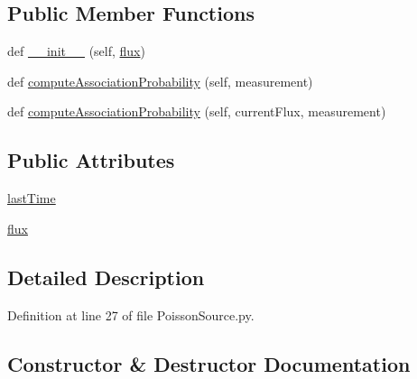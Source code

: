 \subsection*{Public Member Functions}
\begin{DoxyCompactItemize}
\item 
def \hyperlink{classmodest_1_1signals_1_1PoissonSource_1_1__StaticPoissonSource_acf94f57b30499c3a5d2a8ecb252ffcf7}{\+\_\+\+\_\+init\+\_\+\+\_\+} (self, \hyperlink{classmodest_1_1signals_1_1PoissonSource_1_1__PoissonSource_aab3036b1351c531257d2384ea0ff4ae5}{flux})
\item 
def \hyperlink{classmodest_1_1signals_1_1PoissonSource_1_1__StaticPoissonSource_af7b2cc8b56e06566a4c377adb354d377}{compute\+Association\+Probability} (self, measurement)
\item 
def \hyperlink{classmodest_1_1signals_1_1PoissonSource_1_1__PoissonSource_ab8100a2c9f0b5f850ff08f56e7a11cae}{compute\+Association\+Probability} (self, current\+Flux, measurement)
\end{DoxyCompactItemize}
\subsection*{Public Attributes}
\begin{DoxyCompactItemize}
\item 
\hyperlink{classmodest_1_1signals_1_1PoissonSource_1_1__PoissonSource_a96ba5dd0643792be6fbf7af966515a01}{last\+Time}
\item 
\hyperlink{classmodest_1_1signals_1_1PoissonSource_1_1__PoissonSource_aab3036b1351c531257d2384ea0ff4ae5}{flux}
\end{DoxyCompactItemize}


\subsection{Detailed Description}


Definition at line 27 of file Poisson\+Source.\+py.



\subsection{Constructor \& Destructor Documentation}
